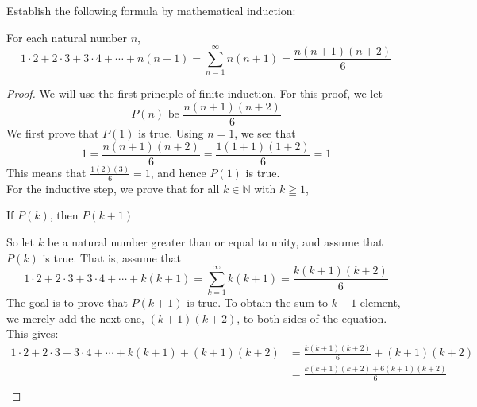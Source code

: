 \newpage
\begin{example}
Establish the following formula by mathematical induction:
    
    \begin{tcolorbox}
        \begin{theorem}
            For each natural number $n$,
                \begin{equation*}
                    {1 \cdot 2} + {2 \cdot 3} + {3 \cdot 4}  + \cdots + n(n + 1) = \sum_{n=1}^{\infty}{n(n+1)} = \frac{n(n+1)(n+2)}{6}
                \end{equation*}
        \end{theorem}
    \end{tcolorbox}

    \begin{proof}
        We will use the first principle of finite induction. For this proof, we let
            \begin{equation*}
                P(n) \text{ be } \frac{n(n+1)(n+2)}{6}
            \end{equation*}
        We first prove that $P(1)$ is true. Using $n=1$, we see that
            \begin{equation*}
                1 = \frac{n(n+1)(n+2)}{6} = \frac{1(1+1)(1+2)}{6} = 1
            \end{equation*}
        This means that $\frac{1(2)(3)}{6}=1$, and hence $P(1)$ is true. \\
        For the inductive step, we prove that for all $k \in \mathbb{N}$ with $k \geqq 1$, 
            \begin{center}
                If $P(k)$, then $P(k+1)$
            \end{center}
        So let $k$ be a natural number greater than or equal to unity, and assume that $P(k)$ is true. That is, assume that 
            \begin{equation*}
               {1 \cdot 2} + {2 \cdot 3} + {3 \cdot 4}  + \cdots + k(k + 1) = \sum_{k=1}^{\infty}{k(k+1)} = \frac{k(k+1)(k+2)}{6}
            \end{equation*}
        The goal is to prove that $P(k+1)$ is true. To obtain the sum to $k+1$ element, we merely add the next one, $(k + 1)(k + 2)$, to both sides of the equation. This gives: 
            \begin{align*}
                {1 \cdot 2} + {2 \cdot 3} + {3 \cdot 4}  + \cdots + k(k + 1) + (k + 1)(k + 2) & =  \frac{k(k+1)(k+2)}{6} + (k + 1)(k + 2) \\
                    & = \frac{k(k+1)(k+2) + 6(k+1)(k+2)}{6} \\

\end{align*}
\end{proof}
\end{example}
